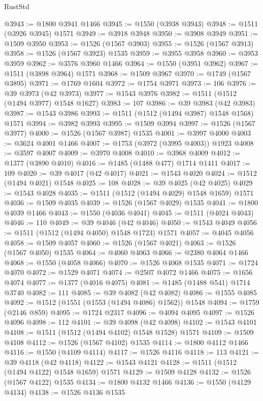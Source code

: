 \begin{lexlean}{RustStd}
\begin{coremodule}
{{@3943 := @1800 @3941 @1466
@3945 := @1550 (@3938 @3943)
@3948 := @1511 (@3926 @3945) @1571
@3949 := @3918 @3948
@3950 := @3908 @3949
@3951 := @1509 @3950
@3953 := @1526 (@1567 @3903)
@3955 := @1526 (@1567 @3913)
@3958 := @1526 (@1567 @3923) @1535
@3959 := @3955 @3958
@3960 := @3953 @3959
@3962 := @3576 @3960 @1466
@3964 := @1550 (@3951 @3962)
@3967 := @1511 (@3898 @3964) @1571
@3968 := @1509 @3967
@3970 := @1749 (@1567 @3895)
@3971 := @1769 @1604
@3972 := @1754 @3971
@3973 := 106
@3976 := @39 @3973 (@42 @3973)
@3977 := @1543 @3976
@3982 := @1511 (@1512 (@1494 @3977) @1548 @1627)
@3983 := 107
@3986 := @39 @3983 (@42 @3983)
@3987 := @1543 @3986
@3993 := @1511 (@1512 (@1494 @3987) @1548 @1568) @1571
@3994 := @3982 @3993
@3995 := @1509 @3994
@3997 := @1526 (@1567 @3977)
@4000 := @1526 (@1567 @3987) @1535
@4001 := @3997 @4000
@4003 := @3624 @4001 @1466
@4007 := @1753 (@3972 (@3995 @4003)) @1923
@4008 := @3597 @4007
@4009 := @3970 @4008
@4010 := @3968 @4009
@4012 := @1377 (@3890 @4010)
@4016 := @1485 (@1488 @477) @1714 @1411
@4017 := 109
@4020 := @39 @4017 (@42 @4017)
@4021 := @1543 @4020
@4024 := @1512 (@1494 @4021) @1548
@4025 := 108
@4028 := @39 @4025 (@42 @4025)
@4029 := @1543 @4028
@4035 := @1511 (@1512 (@1494 @4029) @1548 @1659) @1571
@4036 := @1509 @4035
@4039 := @1526 (@1567 @4029) @1535
@4041 := @1800 @4039 @1466
@4043 := @1550 (@4036 @4041)
@4045 := @1511 (@4024 @4043)
@4046 := 110
@4049 := @39 @4046 (@42 @4046)
@4050 := @1543 @4049
@4056 := @1511 (@1512 (@1494 @4050) @1548 @1723) @1571
@4057 := @4045 @4056
@4058 := @1509 @4057
@4060 := @1526 (@1567 @4021)
@4063 := @1526 (@1567 @4050) @1535
@4064 := @4060 @4063
@4066 := @2380 @4064 @1466
@4068 := @1550 (@4058 @4066)
@4070 := @1526 @4068 @1535
@4071 := @1724 @4070
@4072 := @1529 @4071
@4074 := @2507 @4072 @1466
@4075 := @1656 @4074
@4077 := @1377 (@4016 @4075)
@4081 := @1485 (@1488 @541) @1714 @3740
@4082 := 111
@4085 := @39 @4082 (@42 @4082)
@4086 := @1555 @4085
@4092 := @1512 (@1551 (@1553 (@1494 @4086) @1562)) @1548
@4094 := @1759 (@2146 @859)
@4095 := @1724 @2317
@4096 := @4094 @4095
@4097 := @1526 @4096
@4098 := 112
@4101 := @39 @4098 (@42 @4098)
@4102 := @1543 @4101
@4108 := @1511 (@1512 (@1494 @4102) @1548 @1528) @1571
@4109 := @1509 @4108
@4112 := @1526 (@1567 @4102) @1535
@4114 := @1800 @4112 @1466
@4116 := @1550 (@4109 @4114)
@4117 := @1526 @4116
@4118 := 113
@4121 := @39 @4118 (@42 @4118)
@4122 := @1543 @4121
@4128 := @1511 (@1512 (@1494 @4122) @1548 @1659) @1571
@4129 := @1509 @4128
@4132 := @1526 (@1567 @4122) @1535
@4134 := @1800 @4132 @1466
@4136 := @1550 (@4129 @4134)
@4138 := @1526 @4136 @1535
}}
\end{coremodule}
\end{lexlean}
